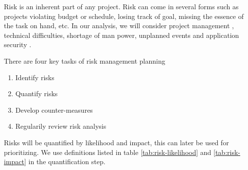
Risk is an inherent part of any project. Risk can come in several forms such as
projects violating budget or schedule, losing track of goal, missing the
essence of the task on hand, etc. In our analysis, we will consider project
management , technical difficulties, shortage of man power, unplanned events
and application security .\cite{wiki:rmf1}

There are four key tasks of risk management planning\cite{wiki:rmf2}
\begin{enumerate}
    \item{Identify risks}
	\item{Quantify risks}
	\item{Develop counter-measures}
    \item{Regularily review risk analysis}
\end{enumerate}

Risks will be quantified by likelihood and impact, this can later be used for
prioritizing. We use definitions listed in table \ref{tab:risk-likelihood} and
\ref{tab:risk-impact} in the quantification step.

